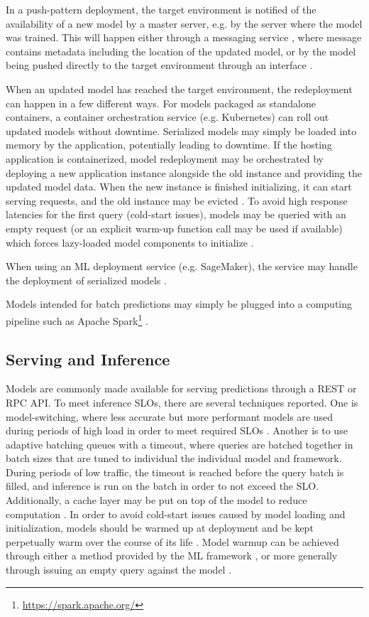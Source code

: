 In a push-pattern deployment, the target environment is notified of the availability of a new model by a master server, e.g. by the server where the model was trained.
This will happen either through a messaging service \cite{Liu2020, Garcia2020}, where message contains metadata including the location of the updated model, or by the model being pushed directly to the target environment through an interface \cite{Paeaekkoenen2020}.

When an updated model has reached the target environment, the redeployment can happen in a few different ways.
For models packaged as standalone containers, a container orchestration service (e.g. Kubernetes) can roll out updated models without downtime.
Serialized models may simply be loaded into memory by the application, potentially leading to downtime.
If the hosting application is containerized, model redeployment may be orchestrated by deploying a new application instance alongside the old instance and providing the updated model data.
When the new instance is finished initializing, it can start serving requests, and the old instance may be evicted \cite{Paeaekkoenen2020}.
To avoid high response latencies for the first query (cold-start issues), models may be queried with an empty request (or an explicit warm-up function call may be used if available) which forces lazy-loaded model components to initialize \cite{Li2017}.

When using an ML deployment service (e.g. SageMaker), the service may handle the deployment of serialized models \cite{Chahal2020}.

Models intended for batch predictions may simply be plugged into a computing pipeline such as Apache Spark\footnote{\url{https://spark.apache.org/}} \cite{Li2017}.

\subsection{Serving and Inference}
Models are commonly made available for serving predictions through a REST \cite{Krishnamurthi2019, Liu2020, Ruf2021, Garcia2020, Crankshaw2017, Paeaekkoenen2020} or RPC \cite{Ruf2021, Li2017, Crankshaw2017} API.
To meet inference SLOs, there are several techniques reported.
One is model-switching, where less accurate but more performant models are used during periods of high load in order to meet required SLOs \cite{Zhang2020}.
Another is to use adaptive batching queues with a timeout, where queries are batched together in batch sizes that are tuned to individual the individual model and framework. During periods of low traffic, the timeout is reached before the query batch is filled, and inference is run on the batch in order to not exceed the SLO.
Additionally, a cache layer may be put on top of the model to reduce computation \cite{Crankshaw2017}.
In order to avoid cold-start issues caused by model loading and initialization, models should be warmed up at deployment and be kept perpetually warm over the course of its life \cite{Zhang2020}.
Model warmup can be achieved through either a method provided by the ML framework \cite{Li2017}, or more generally through issuing an empty query against the model \cite{Garcia2020}.

